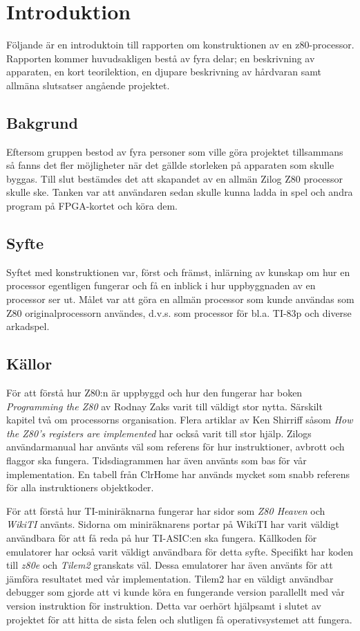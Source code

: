 \documentclass[main.tex]{subfiles}
\begin{document}
\section{Introduktion}
Följande är en introduktoin till rapporten om konstruktionen av en
z80-processor. Rapporten kommer huvudsakligen bestå av fyra delar; en
beskrivning av apparaten, en kort teorilektion, en djupare beskrivning av
hårdvaran samt allmäna slutsatser angående projektet.
\subsection{Bakgrund}
Eftersom gruppen bestod av fyra personer som ville göra projektet tillsammans
så fanns det fler möjligheter när det gällde storleken på apparaten som skulle
byggas. Till slut bestämdes det att skapandet av en allmän Zilog Z80 processor
skulle ske. Tanken var att användaren sedan skulle kunna ladda in spel och
andra program på FPGA-kortet och köra dem.
\subsection{Syfte}
Syftet med konstruktionen var, först och främst, inlärning av kunskap om hur en
processor egentligen fungerar och få en inblick i hur uppbyggnaden av en
processor ser ut. Målet var att göra en allmän processor som kunde användas som
Z80 originalprocessorn användes, d.v.s. som processor för bl.a. TI-83p och
diverse arkadspel.
\subsection{Källor}
För att förstå hur Z80:n är uppbyggd och hur den fungerar har boken {\it
Programming the Z80} \cite{zaks-z80prog} av Rodnay Zaks varit till väldigt stor
nytta. Särskilt kapitel två om processorns organisation. Flera artiklar av Ken
Shirriff såsom {\it How the Z80's registers are implemented}
\cite{shirriff-reg} har också varit till stor hjälp. Zilogs användarmanual
\cite{z80um} har använts väl som referens för hur instruktioner, avbrott och
flaggor ska fungera. Tidsdiagrammen har även använts som bas för vår
implementation. En tabell från ClrHome \cite{clrhome} har används mycket som
snabb referens för alla instruktioners objektkoder.

För att förstå hur TI-miniräknarna fungerar har sidor som {\it Z80 Heaven}
\cite{z80heaven} och {\it WikiTI} \cite{brandonw} använts. Sidorna om
miniräknarens portar på WikiTI har varit väldigt användbara för att få reda på
hur TI-ASIC:en ska fungera. Källkoden för emulatorer har också varit väldigt
användbara för detta syfte. Specifikt har koden till {\it z80e} \cite{z80e} och
{\it Tilem2} \cite{tilem2} granskats väl. Dessa emulatorer har även använts för
att jämföra resultatet med vår implementation. Tilem2 har en väldigt användbar
debugger som gjorde att vi kunde köra en fungerande version parallellt med vår
version instruktion för instruktion. Detta var oerhört hjälpsamt i slutet av
projektet för att hitta de sista felen och slutligen få operativsystemet att
fungera.

\clearpage
\end{document}
